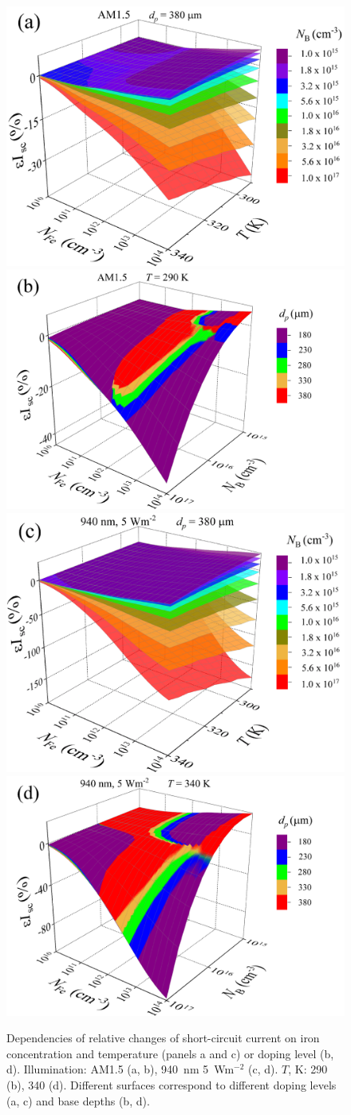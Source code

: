 \documentclass[a4paper,fleqn]{cas-sc}
\begin{document}
\begin{figure}
	\centering
     \includegraphics[width=0.49\linewidth]{Fig3a.png}
     \includegraphics[width=0.49\linewidth]{Fig3b.png}
     \includegraphics[width=0.49\linewidth]{Fig3c.png}
     \includegraphics[width=0.49\linewidth]{Fig3d.png}
	  \caption{Dependencies of relative changes of short-circuit current on iron concentration and
       temperature (panels a and c) or doping level (b, d).
       Illumination: AM1.5 (a, b), 940~nm 5~Wm$^{-2}$ (c, d).
       $T$, K: 290 (b), 340 (d).
       Different surfaces correspond to different doping levels (a, c) and base depths (b, d).
}\label{fig3}
\end{figure}
\end{document}
